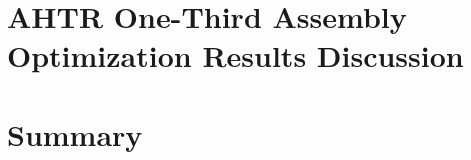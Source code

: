 \section{AHTR One-Third Assembly Optimization Results Discussion}
\label{sec:assem-discussion}

\section{Summary}